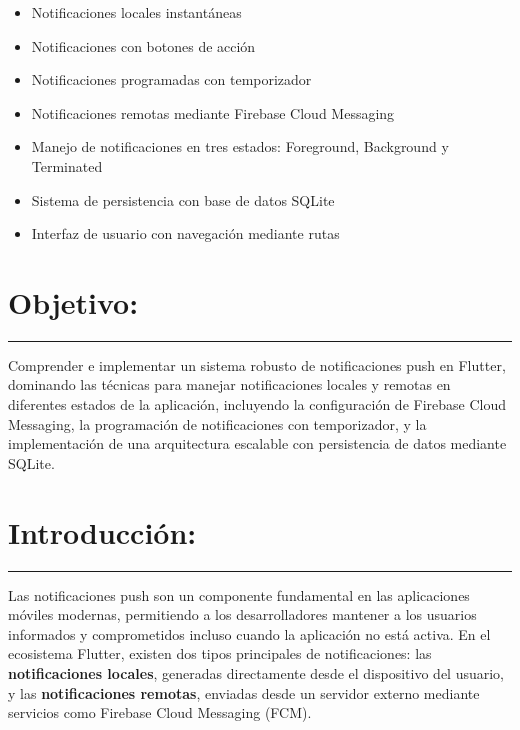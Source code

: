\documentclass[12pt,a4paper]{article}
\newcommand{\grayline}{\noindent\textcolor{gray}{\rule{\textwidth}{1pt}}}
\begin{document}
\begin{itemize}
    \item Notificaciones locales instantáneas
    \item Notificaciones con botones de acción
    \item Notificaciones programadas con temporizador
    \item Notificaciones remotas mediante Firebase Cloud Messaging
    \item Manejo de notificaciones en tres estados: Foreground, Background y Terminated
    \item Sistema de persistencia con base de datos SQLite
    \item Interfaz de usuario con navegación mediante rutas
\end{itemize}

\vspace{1cm}

\section*{Objetivo:}
\grayline{}
\vspace{0.3cm}

Comprender e implementar un sistema robusto de notificaciones push en Flutter, dominando las técnicas para manejar notificaciones locales y remotas en diferentes estados de la aplicación, incluyendo la configuración de Firebase Cloud Messaging, la programación de notificaciones con temporizador, y la implementación de una arquitectura escalable con persistencia de datos mediante SQLite.

\vspace{1cm}

\section*{Introducción:}
\grayline{}
\vspace{0.3cm}

Las notificaciones push son un componente fundamental en las aplicaciones móviles modernas, permitiendo a los desarrolladores mantener a los usuarios informados y comprometidos incluso cuando la aplicación no está activa. En el ecosistema Flutter, existen dos tipos principales de notificaciones: las \textbf{notificaciones locales}, generadas directamente desde el dispositivo del usuario, y las \textbf{notificaciones remotas}, enviadas desde un servidor externo mediante servicios como Firebase Cloud Messaging (FCM).
\end{document}
